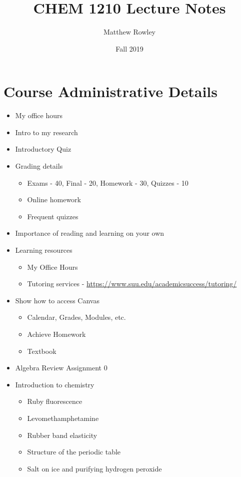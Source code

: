 \documentclass[12pt, openany, letterpaper]{memoir}
\begin{document}
\title{CHEM 1210 Lecture Notes}
\author{Matthew Rowley}
\date{Fall 2019}
\mainmatter
\maketitle
\chapter*{Course Administrative Details}
\begin{itemize}
	\item My office hours
	\item Intro to my research
	\item Introductory Quiz
	\item Grading details
	      \begin{itemize}
		      \item Exams - 40, Final - 20, Homework - 30, Quizzes - 10
		      \item Online homework
		      \item Frequent quizzes
	      \end{itemize}
	\item Importance of reading and learning on your own
	\item Learning resources
	      \begin{itemize}
		      \item My Office Hours
		      \item Tutoring services - \href{https://www.suu.edu/academicsuccess/tutoring/}{https://www.suu.edu/academicsuccess/tutoring/}
	      \end{itemize}
	\item Show how to access Canvas
	      \begin{itemize}
		      \item Calendar, Grades, Modules, etc.
		      \item Achieve Homework
		      \item Textbook
	      \end{itemize}
	\item Algebra Review Assignment 0
	\item Introduction to chemistry
	      \begin{itemize}
		      \item Ruby fluorescence
		      \item Levomethamphetamine
		      \item Rubber band elasticity
		      \item Structure of the periodic table
		      \item Salt on ice and purifying hydrogen peroxide
	      \end{itemize}
\end{itemize}
\end{document}
